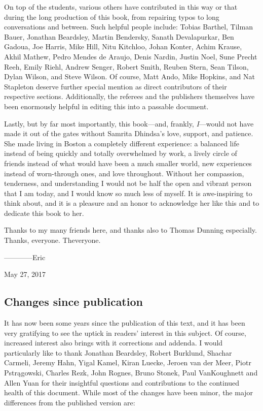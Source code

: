 On top of the students, various others have contributed in this way or that during the long production of this book, from repairing typos to long conversations and between.  Such helpful people include: Tobias Barthel, Tilman Bauer, Jonathan Beardsley, Martin Bendersky, Sanath Devalapurkar, Ben Gadoua, Joe Harris, Mike Hill, Nitu Kitchloo, Johan Konter, Achim Krause, Akhil Mathew, Pedro Mendes de Araujo, Denis Nardin, Justin Noel, Sune Precht Reeh, Emily Riehl, Andrew Senger, Robert Smith, Reuben Stern, Sean Tilson, Dylan Wilson, and Steve Wilson.  Of course, Matt Ando, Mike Hopkins, and Nat Stapleton deserve further special mention as direct contributors of their respective sections.  Additionally, the referees and the publishers themselves have been enormously helpful in editing this into a passable document.

Lastly, but by far most importantly, this book---and, frankly, \emph{I}---would not have made it out of the gates without Samrita Dhindsa's love, support, and patience.  She made living in Boston a completely different experience: a balanced life instead of being quickly and totally overwhelmed by work, a lively circle of friends instead of what would have been a much smaller world, new experiences instead of worn-through ones, and love throughout.  Without her compassion, tenderness, and understanding I would not be half the open and vibrant person that I am today, and I would know so much less of myself.  It is awe-inspiring to think about, and it is a pleasure and an honor to acknowledge her like this and to dedicate this book to her.

Thanks to my many friends here, and thanks also to Thomas Dunning especially.  Thanks, everyone.  Theveryone.

\vspace{2\baselineskip}
\hspace{3em} ------------Eric

\hspace{7em} May 27{\th}, 2017






\cleardoublepage

\subsection*{Changes since publication}

It has now been some years since the publication of this text, and it has been very gratifying to see the uptick in readers' interest in this subject.  Of course, increased interest also brings with it corrections and addenda.  I would particularly like to thank Jonathan Beardsley, Robert Burklund, Shachar Carmeli, Jeremy Hahn, Yigal Kamel, Kiran Luecke, Jeroen van der Meer, Piotr Pstr\k{a}gowski, Charles Rezk, John Rognes, Bruno Stonek, Paul VanKoughnett and Allen Yuan for their insightful questions and contributions to the continued health of this document.  While most of the changes have been minor, the major differences from the published version are:


